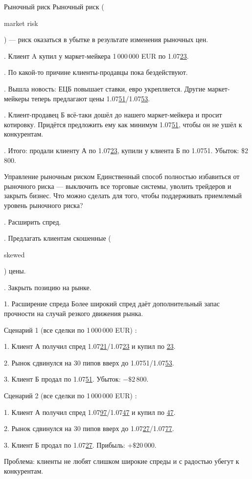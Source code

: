 \documentclass{beamer}
\newcommand{\en}[1]{\begin{otherlanguage}{english}#1\end{otherlanguage}}
\begin{document}
\begin{frame}{Рыночный риск}
\justify
\alert{Рыночный риск} (\en{market risk}) --- риск оказаться в убытке в результате изменения рыночных цен.

. Клиент A купил у маркет-мейкера 1\,000\,000 EUR по 1.07\underline{23}.

. По какой-то причине клиенты-продавцы пока бездействуют.

. Вышла новость: ЕЦБ повышает ставки, евро укрепляется. Другие маркет-мейкеры теперь предлагают цены 1.07\underline{51}/1.07\underline{53}.

. Клиент-продавец Б всё-таки дошёл до нашего маркет-мейкера и просит котировку.
Придётся предложить ему как минимум 1.07\underline{51}, чтобы он не ушёл к конкурентам.

. Итого: продали клиенту А по 1.07\underline{23}, купили у клиента Б по
1.07{51}. Убыток: \$2\,800.
\end{frame}



\begin{frame}{Управление рыночным риском}
\justify
Единственный способ полностью избавиться от рыночного риска --- выключить 
все торговые системы, уволить трейдеров и закрыть бизнес. Что можно сделать
для того, чтобы поддерживать приемлемый уровень рыночного риска?

. Расширить спред.

. Предлагать клиентам скошенные (\en{skewed}) цены.

. Закрыть позицию на рынке.
\end{frame}



\begin{frame}{1. Расширение спреда}
\justify
Более широкий спред даёт дополнительный запас прочности на случай резкого
движения рынка.

\justify
Сценарий 1 (все сделки по 1\,000\,000 EUR) :

1. Клиент А получил спред 1.07\underline{21}/1.07\underline{23} и купил по \underline{23}.

2. Рынок сдвинулся на 30 пипов вверх до 1.07{51}/1.07\underline{53}.

3. Клиент Б продал по 1.07\underline{51}. Убыток: $-\$2\,800$.

\justify
Сценарий 2 (все сделки по 1\,000\,000 EUR) :

1. Клиент А получил спред 1.07\underline{97}/1.07\underline{47} и купил по \underline{47}.

2. Рынок сдвинулся на 30 пипов вверх до 1.07\underline{27}/1.07\underline{77}.

3. Клиент Б продал по 1.07\underline{27}. Прибыль: $+\$20\,000$.

\justify
Проблема: клиенты не любят слишком широкие спреды и с радостью убегут к 
конкурентам.
\end{frame}
\end{document}
